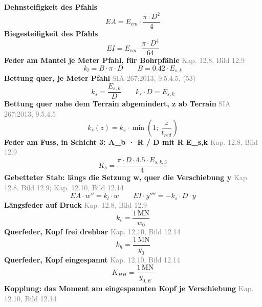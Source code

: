 \documentclass[11pt,a4paper]{article}
\newcommand{\normref}[1]{{\small\textcolor{gray}{#1}}}
\begin{document}
\noindent\textbf{Dehnsteifigkeit des Pfahls}
\begin{equation*}
EA = E_{cm} \cdot \frac{\pi \cdot D^{2}}{4}
\end{equation*}
\noindent\textbf{Biegesteifigkeit des Pfahls}
\begin{equation*}
EI = E_{cm} \cdot \frac{\pi \cdot D^{4}}{64}
\end{equation*}
\noindent\textbf{Feder am Mantel je Meter Pfahl, für Bohrpfähle} \hfill \normref{Kap. 12.8, Bild 12.9}
\begin{equation*}
k_l = B \cdot \pi \cdot D \qquad B = 0.42 \cdot E_{s,k}
\end{equation*}
\noindent\textbf{Bettung quer, je Meter Pfahl} \hfill \normref{SIA 267:2013, 9.5.4.5, (53)}
\begin{equation*}
k_s = \frac{E_{s,k}}{D} \qquad k_s \cdot D = E_{s,k}
\end{equation*}
\noindent\textbf{Bettung quer nahe dem Terrain abgemindert, z ab Terrain} \hfill \normref{SIA 267:2013, 9.5.4.5}
\begin{equation*}
k_s(z) = k_s \cdot \min\left(1;\ \frac{z}{t_{red}}\right)
\end{equation*}
\noindent\textbf{Feder am Fuss, in Schicht 3: A\_b · R / D mit R E\_s,k} \hfill \normref{Kap. 12.8, Bild 12.9}
\begin{equation*}
K_b = \frac{\pi \cdot D \cdot 4.5 \cdot E_{s,k,3}}{4}
\end{equation*}
\noindent\textbf{Gebetteter Stab: längs die Setzung w, quer die Verschiebung y} \hfill \normref{Kap. 12.8, Bild 12.9; Kap. 12.10, Bild 12.14}
\begin{equation*}
EA \cdot w'' = k_l \cdot w \qquad EI \cdot y'''' = -k_s \cdot D \cdot y
\end{equation*}
\noindent\textbf{Längsfeder auf Druck} \hfill \normref{Kap. 12.8, Bild 12.9}
\begin{equation*}
k_v = \frac{1\,\mathrm{MN}}{w_0}
\end{equation*}
\noindent\textbf{Querfeder, Kopf frei drehbar} \hfill \normref{Kap. 12.10, Bild 12.14}
\begin{equation*}
k_h = \frac{1\,\mathrm{MN}}{y_0}
\end{equation*}
\noindent\textbf{Querfeder, Kopf eingespannt} \hfill \normref{Kap. 12.10, Bild 12.14}
\begin{equation*}
K_{HH} = \frac{1\,\mathrm{MN}}{y_{0,E}}
\end{equation*}
\noindent\textbf{Kopplung: das Moment am eingespannten Kopf je Verschiebung} \hfill \normref{Kap. 12.10, Bild 12.14}
\end{document}
